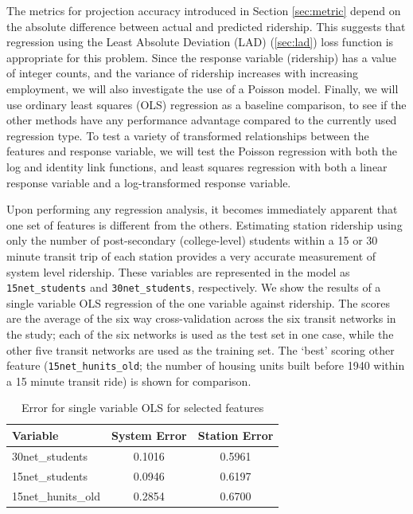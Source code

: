 \documentclass[11pt]{article}
\begin{document}
The metrics for projection accuracy introduced in Section \ref{sec:metric} depend on the absolute difference between actual and predicted ridership. This suggests that regression using the Least Absolute Deviation (LAD) (\ref{sec:lad}) loss function is appropriate for this problem. Since the response variable (ridership) has a value of integer counts, and the variance of ridership increases with increasing employment, we will also investigate the use of a Poisson model. Finally, we will use ordinary least squares (OLS) regression as a baseline comparison, to see if the other methods have any performance advantage compared to the currently used regression type. To test a variety of transformed relationships between the features and response variable, we will test the Poisson regression with both the log and identity link functions, and least squares regression with both a linear response variable and a log-transformed response variable.

Upon performing any regression analysis, it becomes immediately apparent that one set of features is different from the others. Estimating station ridership using only the number of post-secondary (college-level) students within a 15 or 30 minute transit trip of each station provides a very accurate measurement of system level ridership. These variables are represented in the model as \texttt{15net\_students} and \texttt{30net\_students}, respectively. We show the results of a single variable OLS regression of the one variable against ridership. The scores are the average of the six way cross-validation across the six transit networks in the study; each of the six networks is used as the test set in one case, while the other five transit networks are used as the training set. The `best' scoring other feature (\texttt{15net\_hunits\_old}; the number of housing units built before 1940 within a 15 minute transit ride) is shown for comparison.

\begin{table}[H]
\centering
\begin{tabular}{lcc}
\toprule Variable&System Error&Station Error\\
\midrule 30net\_students&0.1016&0.5961\\
15net\_students&0.0946&0.6197\\
15net\_hunits\_old&0.2854&0.6700\\ 
\end{tabular}
\caption{Error for single variable OLS for selected features}\label{tab:students}
\end{table}
\end{document}
